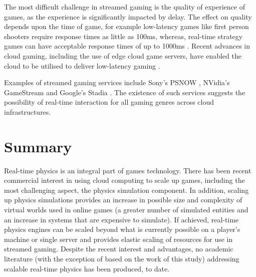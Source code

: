 The most difficult challenge in streamed gaming is the quality of experience of games, as the experience is significantly impacted by delay\cite{StormInCloudGaming}. The effect on quality depends upon the time of game, for example low-latency games like first person shooters require response times as little as 100ms, whereas, real-time strategy games can have acceptable response times of up to 1000ms \cite{CloudGamingArchPerf}. Recent advances in cloud gaming, including the use of edge cloud game servers, have enabled the cloud to be utilised to deliver low-latency gaming \cite{TimelyCloudGaming}.

Examples of streamed gaming services include Sony's PSNOW \cite{PSNOW}, NVidia's GameStream \cite{NVidiaGameStream} and Google's Stadia \cite{Stadia}. The existence of such services suggests the possibility of real-time interaction for all gaming genres across cloud infrastructures.




\section{Summary}
Real-time physics is an integral part of games technology. There has been recent commercial interest in using cloud computing to scale up games, including the most challenging aspect, the physics simulation component. In addition, scaling up physics simulations provides an increase in possible size and complexity of virtual worlds used in online games (a greater number of simulated entities and an increase in systems that are expensive to simulate). If achieved, real-time physics engines can be scaled beyond what is currently possible on a player's machine or single server and provides elastic scaling of resources for use in streamed gaming. Despite the recent interest and advantages, no academic literature (with the exception of \cite{brown2019aura} based on the work of this study) addressing scalable real-time physics has been produced, to date.

